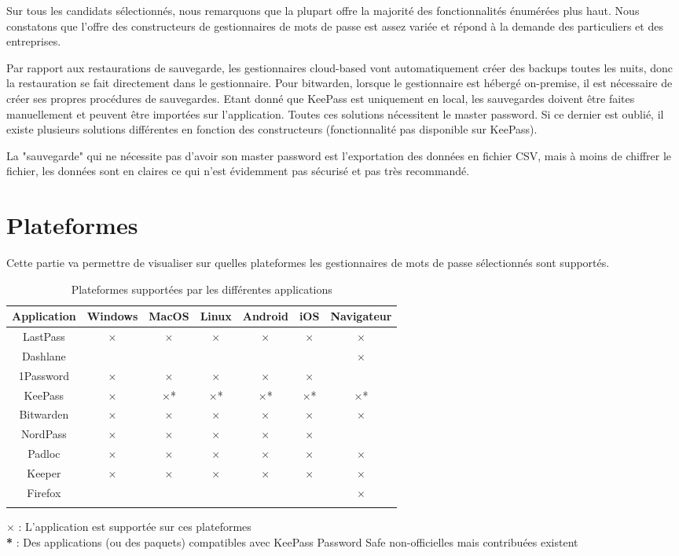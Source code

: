 Sur tous les candidats sélectionnés, nous remarquons que la plupart offre la majorité des fonctionnalités énumérées plus haut. Nous constatons que l'offre des constructeurs de gestionnaires de mots de passe est assez variée et répond à la demande des particuliers et des entreprises.

Par rapport aux restaurations de sauvegarde, les gestionnaires cloud-based vont automatiquement créer des backups toutes les nuits, donc la restauration se fait directement dans le gestionnaire. Pour bitwarden, lorsque le gestionnaire est hébergé on-premise, il est nécessaire de créer ses propres procédures de sauvegardes. Etant donné que KeePass est uniquement en local, les sauvegardes doivent être faites manuellement et peuvent être importées sur l'application. Toutes ces solutions nécessitent le master password. Si ce dernier est oublié, il existe plusieurs solutions différentes en fonction des constructeurs (fonctionnalité pas disponible sur KeePass). 

La "sauvegarde" qui ne nécessite pas d'avoir son master password est l'exportation des données en fichier CSV, mais à moins de chiffrer le fichier, les données sont en claires ce qui n'est évidemment pas sécurisé et pas très recommandé.
\section{Plateformes}
Cette partie va permettre de visualiser sur quelles plateformes les gestionnaires de mots de passe sélectionnés sont supportés. \\
\begin{longtable}[h]{|c|c|c|c|c|c|c|}
	\hline
	Application & Windows & MacOS & Linux & Android & iOS & Navigateur  \\
	\hline
	LastPass & $\times$ & $\times$ & $\times$ & $\times$ & $\times$ &  $\times$\\
		\hline
	Dashlane & &  &  &&  & $\times$  \\
		\hline
	1Password & $\times$ & $\times$ & $\times$ & $\times$ & $\times$& \\
	\hline
	KeePass & $\times$ & $\times$* & $\times$*  & $\times$* & $\times$* &  $\times$*  \\
		\hline
	Bitwarden & $\times$ & $\times$  & $\times$ & $\times$ & $\times$ & $\times$  \\
		\hline
	NordPass & $\times$ & $\times$ & $\times$  & $\times$ & $\times$ &  \\
		\hline
	Padloc & $\times$ & $\times$ & $\times$ & $\times$ & $\times$ & $\times$ \\
		\hline
	Keeper & $\times$ & $\times$ & $\times$ & $\times$ &$\times$ & $\times$ \\
		\hline
	Firefox & &  &  &&  & $\times$  \\
		\hline
	\caption{Plateformes supportées par les différentes applications}
\end{longtable}
$\times$ : L'application est supportée sur ces plateformes \\
\textbf{*}\hspace{0.1cm} :  Des applications (ou des paquets) compatibles avec KeePass Password Safe non-officielles mais contribuées existent \\

